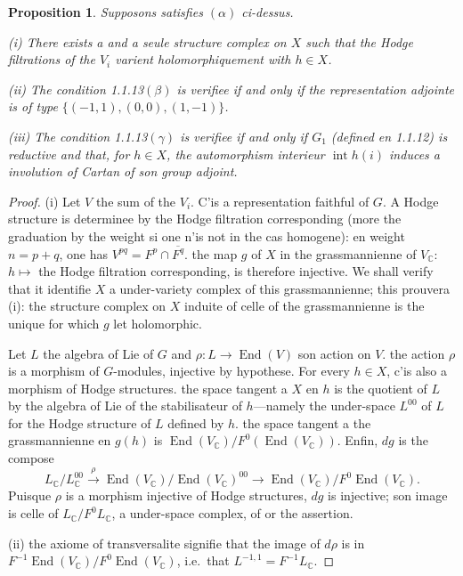 \documentclass[12pt,a4paper]{article}
\theoremstyle{plain}
\newtheorem{proposition}[theorem]{Proposition}
\theoremstyle{definition}
\theoremstyle{remark}
\DeclareMathOperator{\End}{End}
\DeclareMathOperator{\Int}{int}
\newcommand{\CC}{\mathbb{C}}
\begin{document}
\begin{proposition}
Supposons satisfies $(\alpha)$ ci-dessus.

\textup{(i)} There exists a and a seule structure complex on $X$ such that the Hodge filtrations of the $V_i$ varient holomorphiquement with $h \in X$.

\textup{(ii)} The condition 1.1.13$(\beta)$ is verifiee if and only if the representation adjointe is of type $\{(-1,1),(0,0),(1,-1)\}$.

\textup{(iii)} The condition 1.1.13$(\gamma)$ is verifiee if and only if $G_1$ (defined en 1.1.12) is reductive and that, for $h \in X$, the automorphism interieur $\Int h(i)$ induces a involution of Cartan of son group adjoint.
\end{proposition}

\begin{proof}
(i) Let $V$ the sum of the $V_i$. C'is a representation faithful of $G$. A Hodge structure is determinee by the Hodge filtration corresponding (more the graduation by the weight si one n'is not in the cas homogene): en weight $n = p+q$, one has $V^{pq} = F^p \cap \overline{F^q}$. the map $g$ of $X$ in the grassmannienne of $V_{\CC}$: $h \mapsto$ the Hodge filtration corresponding, is therefore injective. We shall verify that it identifie $X$ a under-variety complex of this grassmannienne; this prouvera (i): the structure complex on $X$ induite of celle of the grassmannienne is the unique for which $g$ let holomorphic.

Let $L$ the algebra of Lie of $G$ and $\rho:L \to \End(V)$ son action on $V$. the action $\rho$ is a morphism of $G$-modules, injective by hypothese. For every $h \in X$, c'is also a morphism of Hodge structures. the space tangent a $X$ en $h$ is the quotient of $L$ by the algebra of Lie of the stabilisateur of $h$---namely the under-space $L^{00}$ of $L$ for the Hodge structure of $L$ defined by $h$. the space tangent a the grassmannienne en $g(h)$ is $\End(V_{\CC})/F^0(\End(V_{\CC}))$. Enfin, $dg$ is the compose
\[
L_{\CC}/L^{00}_{\CC} \xrightarrow{\rho} \End(V_{\CC})/\End(V_{\CC})^{00} \to \End(V_{\CC})/F^0\End(V_{\CC}).
\]
Puisque $\rho$ is a morphism injective of Hodge structures, $dg$ is injective; son image is celle of $L_{\CC}/F^0L_{\CC}$, a under-space complex, of or the assertion.

(ii) the axiome of transversalite signifie that the image of $d\rho$ is in $F^{-1}\End(V_{\CC})/F^0\End(V_{\CC})$, i.e.~that $L^{-1,1} = F^{-1}L_{\CC}$.


\end{proof}
\end{document}
